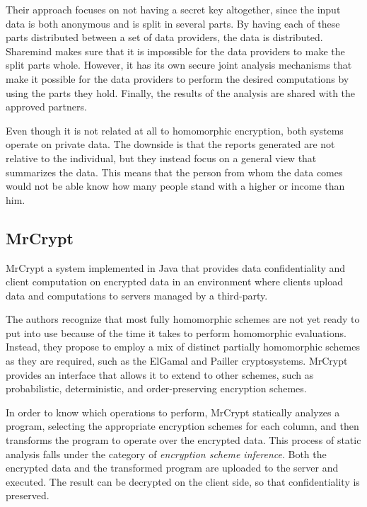 Their approach focuses on not having a secret key altogether, since the input data is both anonymous and is split in several parts. By having each of these parts distributed between a set of data providers, the data is distributed. Sharemind makes sure that it is impossible for the data providers to make the split parts whole. However, it has its own secure joint analysis mechanisms that make it possible for the data providers to perform the desired computations by using the parts they hold. Finally, the results of the analysis are shared with the approved partners.

Even though it is not related at all to homomorphic encryption, both systems operate on private data. The downside is that the reports generated are not relative to the individual, but they instead focus on a general view that summarizes the data. This means that the person from whom the data comes would not be able know how many people stand with a higher or income than him.

\subsection{MrCrypt}
MrCrypt \cite{Tetali:2013:MSA:2544173.2509554} a system implemented in Java that provides data confidentiality and client computation on encrypted data in an environment where clients upload data and computations to servers managed by a third-party.

The authors recognize that most fully homomorphic schemes are not yet ready to put into use because of the time it takes to perform homomorphic evaluations. Instead, they propose to employ a mix of distinct partially homomorphic schemes as they are required, such as the ElGamal \cite{ElGamal:1985:PKC:19478.19480} and Pailler \cite{Paillier:1999:PCB:1756123.1756146} cryptosystems. MrCrypt provides an interface that allows it to extend to other schemes, such as probabilistic, deterministic, and order-preserving encryption schemes. 

In order to know which operations to perform, MrCrypt statically analyzes a program, selecting the appropriate encryption schemes for each column, and then transforms the program to operate over the encrypted data. This process of static analysis falls under the category of \emph{encryption scheme inference}. Both the encrypted data and the transformed program are uploaded to the server and executed. The result can be decrypted on the client side, so that confidentiality is preserved.


